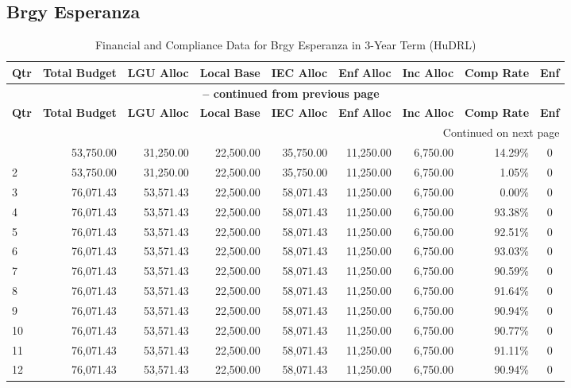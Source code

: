 \subsection{Brgy Esperanza}
\begin{longtable}{lrrrrrrrc}
\caption{Financial and Compliance Data for Brgy Esperanza in 3-Year Term (HuDRL)} \\
\toprule
\textbf{Qtr} & \textbf{Total Budget} & \textbf{LGU Alloc} & \textbf{Local Base} & \textbf{IEC Alloc} & \textbf{Enf Alloc} & \textbf{Inc Alloc} & \textbf{Comp Rate} & \textbf{Enf} \\
\midrule
\endfirsthead
\multicolumn{9}{c}{{\bfseries \tablename\ \thetable{} -- continued from previous page}} \\
\toprule
\textbf{Qtr} & \textbf{Total Budget} & \textbf{LGU Alloc} & \textbf{Local Base} & \textbf{IEC Alloc} & \textbf{Enf Alloc} & \textbf{Inc Alloc} & \textbf{Comp Rate} & \textbf{Enf} \\
\midrule
\endhead
\hline \multicolumn{9}{r}{{Continued on next page}} \\ \hline
\endfoot
\bottomrule
\endlastfoot
1 & 53,750.00 & 31,250.00 & 22,500.00 & 35,750.00 & 11,250.00 & 6,750.00 & 14.29\% & 0 \\
2 & 53,750.00 & 31,250.00 & 22,500.00 & 35,750.00 & 11,250.00 & 6,750.00 & 1.05\% & 0 \\
3 & 76,071.43 & 53,571.43 & 22,500.00 & 58,071.43 & 11,250.00 & 6,750.00 & 0.00\% & 0 \\
4 & 76,071.43 & 53,571.43 & 22,500.00 & 58,071.43 & 11,250.00 & 6,750.00 & 93.38\% & 0 \\
5 & 76,071.43 & 53,571.43 & 22,500.00 & 58,071.43 & 11,250.00 & 6,750.00 & 92.51\% & 0 \\
6 & 76,071.43 & 53,571.43 & 22,500.00 & 58,071.43 & 11,250.00 & 6,750.00 & 93.03\% & 0 \\
7 & 76,071.43 & 53,571.43 & 22,500.00 & 58,071.43 & 11,250.00 & 6,750.00 & 90.59\% & 0 \\
8 & 76,071.43 & 53,571.43 & 22,500.00 & 58,071.43 & 11,250.00 & 6,750.00 & 91.64\% & 0 \\
9 & 76,071.43 & 53,571.43 & 22,500.00 & 58,071.43 & 11,250.00 & 6,750.00 & 90.94\% & 0 \\
10 & 76,071.43 & 53,571.43 & 22,500.00 & 58,071.43 & 11,250.00 & 6,750.00 & 90.77\% & 0 \\
11 & 76,071.43 & 53,571.43 & 22,500.00 & 58,071.43 & 11,250.00 & 6,750.00 & 91.11\% & 0 \\
12 & 76,071.43 & 53,571.43 & 22,500.00 & 58,071.43 & 11,250.00 & 6,750.00 & 90.94\% & 0 \\
\end{longtable}
\newpage
